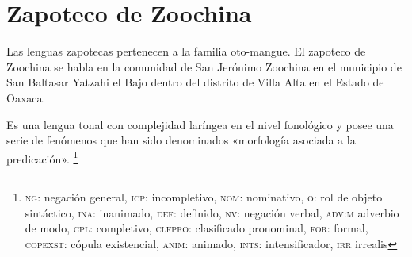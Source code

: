 \section*{Zapoteco de Zoochina}

\noindent Las lenguas zapotecas pertenecen a la familia oto-mangue. El zapoteco de Zoochina se habla en la comunidad de San Jerónimo Zoochina en el municipio de San Baltasar Yatzahi el Bajo dentro del distrito de Villa Alta en el Estado de Oaxaca. 

Es una lengua tonal con complejidad laríngea en el nivel fonológico y posee una serie de fenómenos que han sido denominados «morfología asociada a la predicación». \footnote{\textsc{ng:} negación general, \textsc{icp:} incompletivo, \textsc{nom:} nominativo, \textsc{o:} rol de objeto sintáctico, \textsc{ina:} inanimado, \textsc{def:} definido, \textsc{nv:} negación verbal, \textsc{adv:m} adverbio de modo, \textsc{cpl:} completivo, \textsc{clfpro:} clasificado pronominal, \textsc{for:} formal, \textsc{copexst:} cópula existencial, \textsc{anim:} animado, \textsc{ints:} intensificador, \textsc{irr} irrealis} \vspace{0.5cm}

